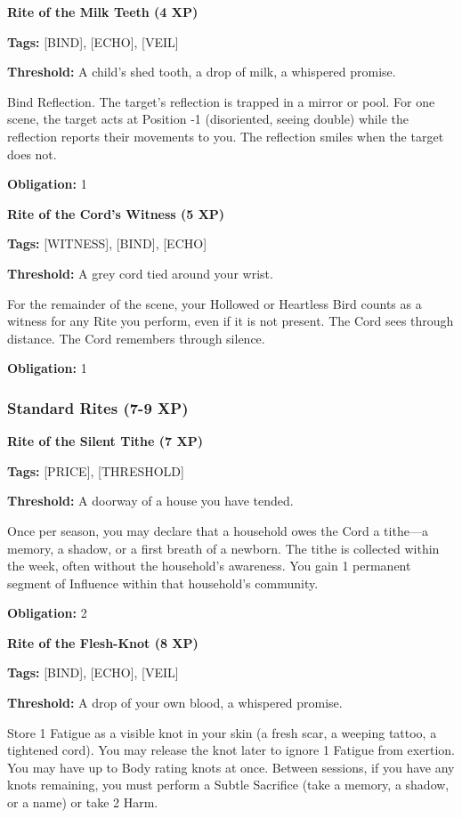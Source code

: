 \textbf{Rite of the Milk Teeth (4 XP)}

\textbf{Tags:} [BIND], [ECHO], [VEIL]

\textbf{Threshold:} A child's shed tooth, a drop of milk, a whispered promise.

Bind Reflection. The target's reflection is trapped in a mirror or pool. For one scene, the target acts at Position -1 (disoriented, seeing double) while the reflection reports their movements to you. The reflection smiles when the target does not.

\textbf{Obligation:} 1

\vspace{0.5em}

\textbf{Rite of the Cord's Witness (5 XP)}

\textbf{Tags:} [WITNESS], [BIND], [ECHO]

\textbf{Threshold:} A grey cord tied around your wrist.

For the remainder of the scene, your Hollowed or Heartless Bird counts as a witness for any Rite you perform, even if it is not present. The Cord sees through distance. The Cord remembers through silence.

\textbf{Obligation:} 1

\subsubsection{Standard Rites (7-9 XP)}

\textbf{Rite of the Silent Tithe (7 XP)}

\textbf{Tags:} [PRICE], [THRESHOLD]

\textbf{Threshold:} A doorway of a house you have tended.

Once per season, you may declare that a household owes the Cord a tithe—a memory, a shadow, or a first breath of a newborn. The tithe is collected within the week, often without the household's awareness. You gain 1 permanent segment of Influence within that household's community.

\textbf{Obligation:} 2

\vspace{0.5em}

\textbf{Rite of the Flesh-Knot (8 XP)}

\textbf{Tags:} [BIND], [ECHO], [VEIL]

\textbf{Threshold:} A drop of your own blood, a whispered promise.

Store 1 Fatigue as a visible knot in your skin (a fresh scar, a weeping tattoo, a tightened cord). You may release the knot later to ignore 1 Fatigue from exertion. You may have up to Body rating knots at once. Between sessions, if you have any knots remaining, you must perform a Subtle Sacrifice (take a memory, a shadow, or a name) or take 2 Harm.

